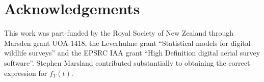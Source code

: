 \documentclass[useAMS, usenatbib, referee]{biom}\usepackage[]{graphicx}\usepackage[]{color}
\begin{document}


\section*{Acknowledgements}
This work was part-funded by the Royal Society of New Zealand through Marsden grant UOA-1418, the Leverhulme grant ``Statistical models for digital wildlife surveys'' and the EPSRC IAA grant ``High Definition digital aerial survey software''. Stephen Marsland contributed substantially to obtaining the correct expression for $f_T(t)$.




\end{document}
